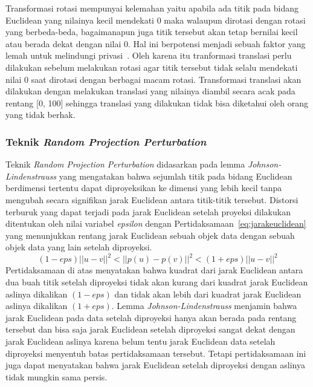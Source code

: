 Transformasi rotasi mempunyai kelemahan yaitu apabila ada titik pada bidang Euclidean yang nilainya kecil mendekati 0 maka walaupun dirotasi dengan rotasi yang berbeda-beda, bagaimanapun juga titik tersebut akan tetap bernilai kecil atau berada dekat dengan nilai 0. Hal ini berpotensi menjadi sebuah faktor yang lemah untuk melindungi privasi~\cite{rotation:05:chenliu}. Oleh karena itu tranformasi translasi perlu dilakukan sebelum melakukan rotasi agar titik tersebut tidak selalu mendekati nilai 0 saat dirotasi dengan berbagai macam rotasi. Transformasi translasi akan dilakukan dengan melakukan translasi yang nilainya diambil secara acak pada rentang [0, 100] sehingga translasi yang dilakukan tidak bisa diketahui oleh orang yang tidak berhak.

\subsubsection{Teknik \textit{Random Projection Perturbation}}
\label{subsubsec:analisis-projection}

Teknik \textit{Random Projection Perturbation} didasarkan pada lemma \textit{Johnson-Lindenstrauss} yang mengatakan bahwa sejumlah titik pada bidang Euclidean berdimensi tertentu dapat diproyeksikan ke dimensi yang lebih kecil tanpa mengubah secara signifikan jarak Euclidean antara titik-titik tersebut. Distorsi terburuk yang dapat terjadi pada jarak Euclidean setelah proyeksi dilakukan ditentukan oleh nilai variabel \textit{epsilon} dengan Pertidaksamaan~\ref{eq:jarakeuclidean} yang menunjukkan rentang jarak Euclidean sebuah objek data dengan sebuah objek data yang lain setelah diproyeksi.
\begin{equation}\label{eq:jarakeuclidean}
	(1-eps)||u - v||^{2}<||p(u) - p(v)||^{2}<(1+eps)||u - v||^{2}
\end{equation}
Pertidaksamaan di atas menyatakan bahwa kuadrat dari jarak Euclidean antara dua buah titik setelah diproyeksi tidak akan kurang dari kuadrat jarak Euclidean aslinya dikalikan \((1-eps)\) dan tidak akan lebih dari kuadrat jarak Euclidean aslinya dikalikan \((1+eps)\). Lemma \textit{Johnson-Lindenstrauss} menjamin bahwa jarak Euclidean pada data setelah diproyeksi hanya akan berada pada rentang tersebut dan bisa saja jarak Euclidean setelah diproyeksi sangat dekat dengan jarak Euclidean aslinya karena belum tentu jarak Euclidean data setelah diproyeksi menyentuh batas pertidaksamaan tersebut. Tetapi pertidaksamaan ini juga dapat menyatakan bahwa jarak Euclidean setelah diproyeksi dengan aslinya tidak mungkin sama persis.

